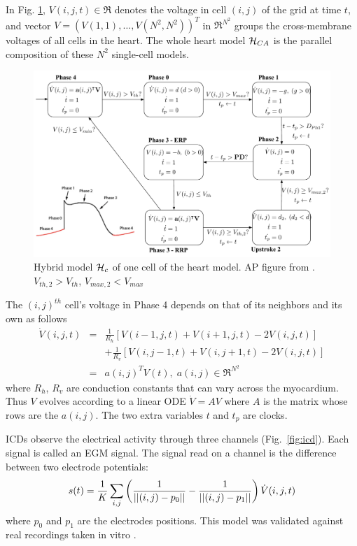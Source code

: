 In Fig. \ref{fig:cellaut}, $V(i,j,t) \in \Re$ denotes the voltage in cell $(i,j)$ of the grid at time $t$, and vector $V =(V(1,1),\ldots, V(N^2,N^2))^T$ in $\Re^{N^2}$ groups the cross-membrane voltages of all cells in the heart.
The whole heart model $\mathcal{H}_{CA}$ is the parallel composition of these $N^2$ single-cell models. 
\begin{figure}[t]
	\centering
	\includegraphics[scale=0.26]{figures/cellaut1v2}
	\vspace{-10pt}
	\caption{Hybrid model $\mathcal{H}_c$ of one cell of the heart model. AP figure from \cite{eplab}. 
		$V_{th,2}>V_{th}$, $V_{max,2}<V_{max}$}
	\vspace{-10pt}
	\label{fig:cellaut}
\end{figure}
%
The $(i,j)^{th}$ cell's voltage in Phase 4 depends on that of its neighbors and its own as follows \cite{Spector11_Emergence}
\begin{eqnarray}
\dot{V}(i,j,t) &=& \frac{1}{R_h}[V(i-1,j,t)+V(i+1,j,t) - 2V(i,j,t)] 
\nonumber \\ 
&& +  \frac{1}{R_v}[V(i,j-1,t) +  V(i,j+1,t) - 2V(i,j,t)]  
\nonumber\\
&=& a(i,j)^TV(t), \; a(i,j) \in \Re^{N^2}
\;
\end{eqnarray}
where $R_h$, $R_v$ are conduction constants that can vary across the myocardium.
Thus $V$ evolves according to a linear ODE $\dot{V} = AV$ where $A$ is the matrix whose rows are the $a(i,j)$. 
The two extra variables $t$ and $t_p$ are clocks.

\acp{ICD} observe the electrical activity through three channels (Fig.~\ref{fig:icd}).
Each signal is called an \ac{EGM} signal.
The signal read on a channel is the difference between two electrode potentials:
\begin{equation}
	\label{eq:vegm}
	s(t) = \frac{1}{K} \sum_{i,j} \left(\frac{1}{||(i,j)-p_0|| } - \frac{1}{||(i,j)-p_1||}\right) \dot{V}(i,j,t)
\end{equation}
where $p_0$ and $p_1$ are the electrodes positions.
This model was validated against real recordings taken in vitro \cite{StinnettDonnelly12_EGMresolution}.

